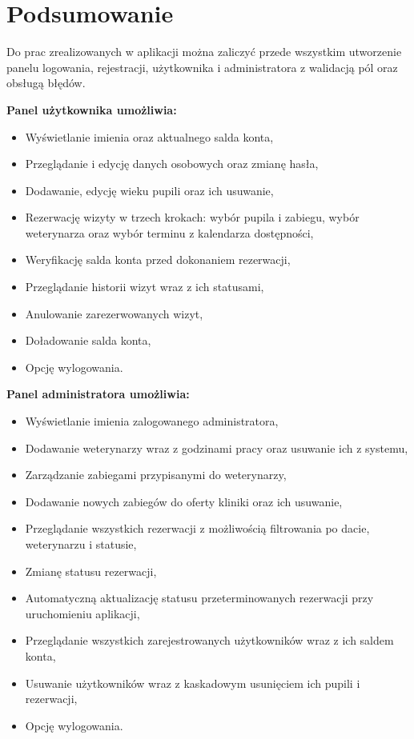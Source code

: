 \chapter{Podsumowanie}

Do prac zrealizowanych w aplikacji można zaliczyć przede wszystkim utworzenie panelu logowania, rejestracji, użytkownika i administratora z 
walidacją pól oraz obsługą błędów. 

\vspace{5pt}

\textbf{Panel użytkownika umożliwia:}

\begin{itemize}
\item Wyświetlanie imienia oraz aktualnego salda konta,
\item Przeglądanie i edycję danych osobowych oraz zmianę hasła,
\item Dodawanie, edycję wieku pupili oraz ich usuwanie,
\item Rezerwację wizyty w trzech krokach: wybór pupila i zabiegu, wybór weterynarza oraz wybór terminu z kalendarza dostępności,
\item Weryfikację salda konta przed dokonaniem rezerwacji,
\item Przeglądanie historii wizyt wraz z ich statusami,
\item Anulowanie zarezerwowanych wizyt,
\item Doładowanie salda konta,
\item Opcję wylogowania.
\end{itemize}

\vspace{5pt}

\textbf{Panel administratora umożliwia:}

\begin{itemize}
\item Wyświetlanie imienia zalogowanego administratora,
\item Dodawanie weterynarzy wraz z godzinami pracy oraz usuwanie ich z systemu,
\item Zarządzanie zabiegami przypisanymi do weterynarzy,
\item Dodawanie nowych zabiegów do oferty kliniki oraz ich usuwanie,
\item Przeglądanie wszystkich rezerwacji z możliwością filtrowania po dacie, weterynarzu i statusie,
\item Zmianę statusu rezerwacji,
\item Automatyczną aktualizację statusu przeterminowanych rezerwacji przy uruchomieniu aplikacji,
\item Przeglądanie wszystkich zarejestrowanych użytkowników wraz z ich saldem konta,
\item Usuwanie użytkowników wraz z kaskadowym usunięciem ich pupili i rezerwacji,
\item Opcję wylogowania.
\end{itemize}


